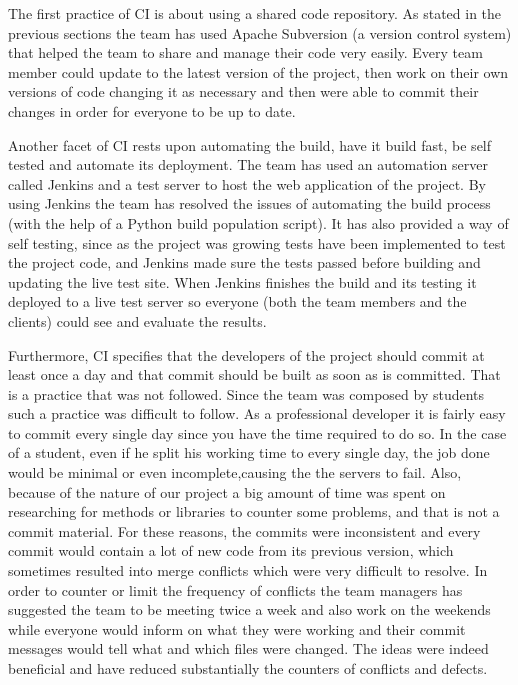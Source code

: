 \documentclass{l3proj}
\begin{document}
The first practice of CI is about using a shared code repository. As stated in the previous sections the team has
used Apache Subversion (a version control system) that helped the team to share and manage their code very easily. Every team
member could update to the latest version of the project, then work on their own versions of code changing it as
necessary and then were able to commit their changes in order for everyone to be up to date.

Another facet of CI rests upon automating the build, have it build fast, be self tested and automate its
deployment. The team has used an automation server called Jenkins and a test server to host the web application of the
project. By using Jenkins the team has resolved the issues of automating the build process (with the help of a Python build
population script). It has also provided a way of self testing, since as the project was growing tests have been
implemented to test the project code, and Jenkins made sure the tests passed before building and updating the live test site.
When Jenkins finishes the build and its testing it deployed to a live test server so everyone (both the team members and
the clients) could see and evaluate the results.

Furthermore, CI specifies that the developers of the project should commit at least once a day and that commit should
be built as soon as is committed. That is a practice that was not followed. Since the team was composed by students
such a practice was difficult to follow. As a professional developer it is fairly easy to commit every single day
since you have the time required to do so. In the case of a student, even if he split his working time to every single
day, the job done would be minimal or even incomplete,causing the the servers to fail. Also, because of the nature of
our project a big amount of time was spent on researching for methods or libraries to counter some problems, and that is
not a commit material. For these reasons, the commits were inconsistent and every commit would contain a lot of new
code from its previous version, which sometimes resulted into merge conflicts which were very difficult to resolve. In
order to counter or limit the frequency of conflicts the team managers has suggested the team to be meeting twice a week
and also work on the weekends while everyone would inform on what they were working and their commit messages would tell
what and which files were changed. The ideas were indeed beneficial and have reduced substantially the counters of
conflicts and defects.
\end{document}
